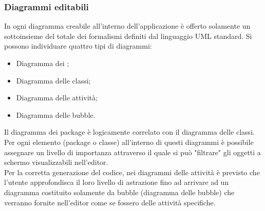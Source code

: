 \documentclass[../PianoDiQualifica.tex]{subfiles}
\begin{document}
			\subsubsection{Diagrammi editabili}
				In ogni diagramma creabile all'interno dell'applicazione è offerto solamente un
				sottoinsieme del totale dei formalismi definiti dal linguaggio UML standard.
				Si possono individuare quattro tipi di diagrammi:
				\begin{itemize}
					\item Diagramma dei ;
					\item Diagramma delle classi;
					\item Diagramma delle attività;
					\item Diagramma delle bubble.
				\end{itemize}
				Il diagramma dei package è logicamente correlato con il diagramma delle classi. Per ogni
				elemento (package o classe) all'interno di questi diagrammi è possibile assegnare un
				livello di importanza attraverso il quale si può "filtrare" gli oggetti a schermo
				visualizzabili nell'editor.\\
				Per la corretta generazione del codice, nei diagrammi delle attività è previsto che
				l'utente approfondisca il loro livello di astrazione fino ad arrivare ad un diagramma
				costituito solamente da bubble (diagramma delle bubble) che verranno fornite nell'editor
				come se fossero delle attività specifiche.
\end{document}
